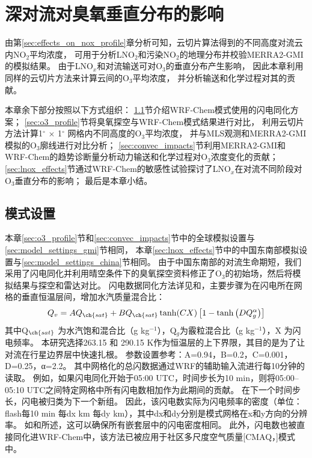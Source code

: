 
\chapter{深对流对臭氧垂直分布的影响}

由第\ref{sec:effects_on_nox_profile}章分析可知，云切片算法得到的不同高度对流云内NO$_2$平均浓度，
可用于分析LNO$_2$和污染NO$_2$的地理分布并校验MERRA2-GMI的模拟结果。
由于LNO$_x$和对流输送可对O$_3$的垂直分布产生影响，
因此本章利用同样的云切片方法来计算云间的O$_3$平均浓度，
并分析输送和化学过程对其的贡献。

本章余下部分按照以下方式组织：
\ref{sec:model_settings_assimilation}节介绍WRF-Chem模式使用的闪电同化方案；
\ref{sec:o3_profile}节将臭氧探空与WRF-Chem模式结果进行对比，
利用云切片方法计算1$^{\circ}$ $\times$ 1$^{\circ}$ 网格内不同高度的O$_3$平均浓度，
并与MLS观测和MERRA2-GMI模拟的O$_3$廓线进行对比分析；
\ref{sec:convec_impacts}节利用MERRA2-GMI和WRF-Chem的趋势诊断量分析动力输送和化学过程对O$_3$浓度变化的贡献；
\ref{sec:lnox_effects}节通过WRF-Chem的敏感性试验探讨了LNO$_x$在对流不同阶段对O$_3$垂直分布的影响；
最后是本章小结。


\section{模式设置} \label{sec:model_settings_assimilation}

本章\ref{sec:o3_profile}节和\ref{sec:convec_impacts}节中的全球模拟设置与\ref{sec:model_settings_gmi}节相同，
本章\ref{sec:lnox_effects}节中的中国东南部模拟设置与\ref{sec:model_settings_china}节相同。
由于中国东南部的对流生命期短，我们采用了闪电同化并利用晴空条件下的臭氧探空资料修正了O$_3$的初始场，然后将模拟结果与探空和雷达对比。
闪电数据同化方法详见\citet{Fierro.2012}和\citet{Li.2017b}，主要步骤为在闪电所在网格的垂直恒温层间，增加水汽质量混合比：
\begin{equation} \label{eq:lda}
Q_{v}=A Q_{\ch{sat}}+B Q_{\ch{sat}} \tanh (C X)\left[1-\tanh \left(D Q_{g}^{\alpha}\right)\right]
\end{equation}
其中Q$_{\ch{sat}}$ 为水汽饱和混合比（g kg$^{−1}$），Q$_g$为霰粒混合比（g kg$^{−1}$），X 为闪电频率。
本研究选择263.15 和 290.15 K作为恒温层的上下界限，其目的是为了让对流在行星边界层中快速扎根\citep{Marchand.2014,Finney.2016,Li.2017b}。
参数设置参考\citet{Li.2017b}：A=0.94，B=0.2，C=0.001，D=0.25，α=2.2。
其中网格化的总闪数据通过WRF的辅助输入流进行每10分钟的读取。
例如，如果闪电同化开始于05:00 UTC，时间步长为10 min，则将05:00--05:10 UTC之间特定网格中所有闪电数相加作为此期间的贡献。
在下一个时间步长，闪电被归类为下一个新组。
因此，该闪电数实际为闪电频率的密度（单位：flash每10 min 每dx km 每dy km），其中dx和dy分别是模式网格在x和y方向的分辨率。
如\citet{Fierro.2012}和\citet{Li.2017b}所述，这可以确保所有嵌套层中的闪电密度相同。
此外，闪电数也被直接同化进WRF-Chem中，该方法已被应用于社区多尺度空气质量[CMAQ，\citet{Kang.2019a,Kang.2019,Kang.2020}]模式中。


